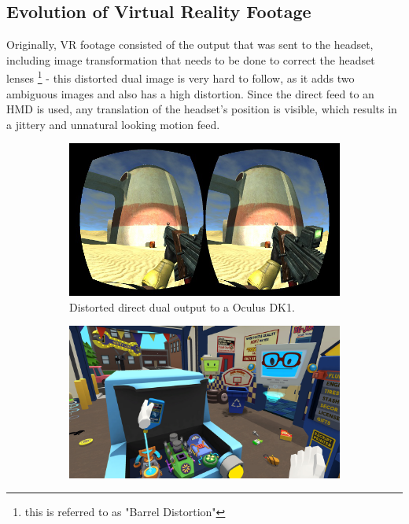 \subsection{Evolution of Virtual Reality Footage}

Originally, VR footage consisted of the output that was sent to the headset, 
including image transformation that needs to be done to correct the headset 
lenses \footnote{this is referred to as "Barrel Distortion"} - this distorted 
dual image is very hard to follow, as it adds two ambiguous images and also has 
a high distortion. Since the direct feed to an HMD is used, any 
translation of the headset's position is visible, which results in a jittery 
and unnatural looking motion feed.

\begin{figure}[htbp]
	\begin{subfigure}[t]{.45\textwidth}
		\centering
		\includegraphics[width=\textwidth]{gfx/evolution/torque3d-bdist.png}
		\caption{Distorted direct dual output to a Oculus 
		DK1\cite{wyand:torqu3d:2013}.}
	\end{subfigure}
	\begin{subfigure}[t]{.45\textwidth}
		\centering
		\includegraphics[width=\textwidth]{gfx/evolution/owlch-car.png}

\end{subfigure}
\end{figure}
